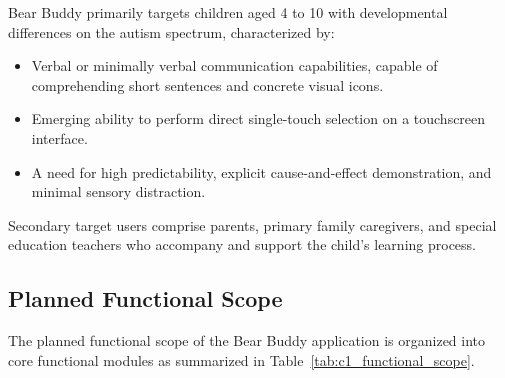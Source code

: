 Bear Buddy primarily targets children aged 4 to 10 with developmental differences on the autism spectrum, characterized by:
\begin{itemize}
    \item Verbal or minimally verbal communication capabilities, capable of comprehending short sentences and concrete visual icons.
    \item Emerging ability to perform direct single-touch selection on a touchscreen interface.
    \item A need for high predictability, explicit cause-and-effect demonstration, and minimal sensory distraction.
\end{itemize}

Secondary target users comprise parents, primary family caregivers, and special education teachers who accompany and support the child's learning process.

\subsection{Planned Functional Scope}

The planned functional scope of the Bear Buddy application is organized into core functional modules as summarized in Table~\ref{tab:c1_functional_scope}.

